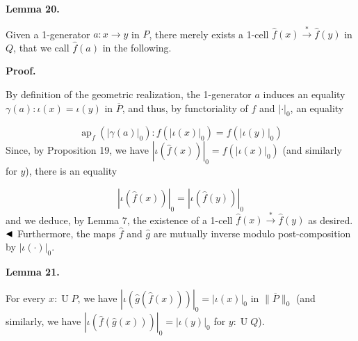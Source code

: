  
\par\medskip\noindent\textbf{Lemma 20.}\par
 
 
Given a 1-generator $a:x\to y$ in $P$, there merely exists a 1-cell $\hat{f}(x)\overset{*}{\to}\hat{f}(y)$ in $Q$, that we call $\hat{f}(a)$ in the following.\par
 
 
 
 
 
\par\medskip\noindent\textbf{Proof.}\par
 
 
By definition of the geometric realization, the 1-generator $a$ induces an equality $\gamma(a):\iota(x)=\iota(y)$ in $\overline{P}$, and thus, by functoriality of $f$ and $|\cdot|_{0}$, an equality\par
    \[\operatorname{ap}_{f}(|\gamma(a)|_{0}):f(|\iota(x)|_{0})=f(|\iota(y)|_{0})\]    
Since, by Proposition 19, we have $|\iota(\hat{f}(x))|_{0}=f(|\iota(x)|_{0})$ (and similarly for $y$), there is an equality\par
    \[|\iota(\hat{f}(x))|_{0}=|\iota(\hat{f}(y))|_{0}\]    
and we deduce, by Lemma 7, the existence of a 1-cell $\hat{f}(x)\overset{*}{\to}\hat{f}(y)$ as desired. $\hfill\blacktriangleleft$ Furthermore, the maps $\hat{f}$ and $\hat{g}$ are mutually inverse modulo post-composition by $|\iota(\cdot)|_{0}$.\par
 
 
 
\par\medskip\noindent\textbf{Lemma 21.}\par
 
 
For every $x:\operatorname{U}P$, we have $|\iota(\hat{g}(\hat{f}(x)))|_{0}=|\iota(x)|_{0}$ in $\|\overline{P}\|_{0}$ (and similarly, we have $|\iota(\hat{f}(\hat{g}(x)))|_{0}=|\iota(y)|_{0}$ for $y:\operatorname{U}Q$).\par
 
